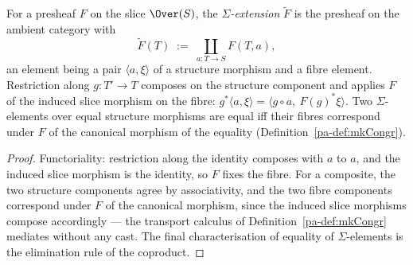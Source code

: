 \begin{definition}
  \label{pa-def:sigmaExtension}
  \leanok

  For a presheaf \(F\) on the slice \(\Over(S)\), the \emph{\(\Sigma\)-extension}
  \(\widetilde F\) is the presheaf on the ambient category with
  \[
    \widetilde F(T) \;:=\; \coprod_{a \colon T \to S} F(T, a) ,
  \]
  an element being a pair \(\langle a, \xi\rangle\) of a structure morphism and a fibre
  element. Restriction along \(g \colon T' \to T\) composes on the structure component and
  applies \(F\) of the induced slice morphism on the fibre:
  \(g^{*}\langle a, \xi \rangle = \langle g \circ a,\ F(g)^{*}\xi\rangle\). Two
  \(\Sigma\)-elements over equal structure morphisms are equal iff their fibres correspond
  under \(F\) of the canonical morphism of the equality (Definition~\ref{pa-def:mkCongr}).
\end{definition}
\begin{proof}
  \leanok
  Functoriality: restriction along the identity composes with \(a\) to \(a\), and the
  induced slice morphism is the identity, so \(F\) fixes the fibre. For a composite, the two
  structure components agree by associativity, and the two fibre components correspond under
  \(F\) of the canonical morphism, since the induced slice morphisms compose accordingly —
  the transport calculus of Definition~\ref{pa-def:mkCongr} mediates without any cast. The
  final characterisation of equality of \(\Sigma\)-elements is the elimination rule of the
  coproduct.
\end{proof}

